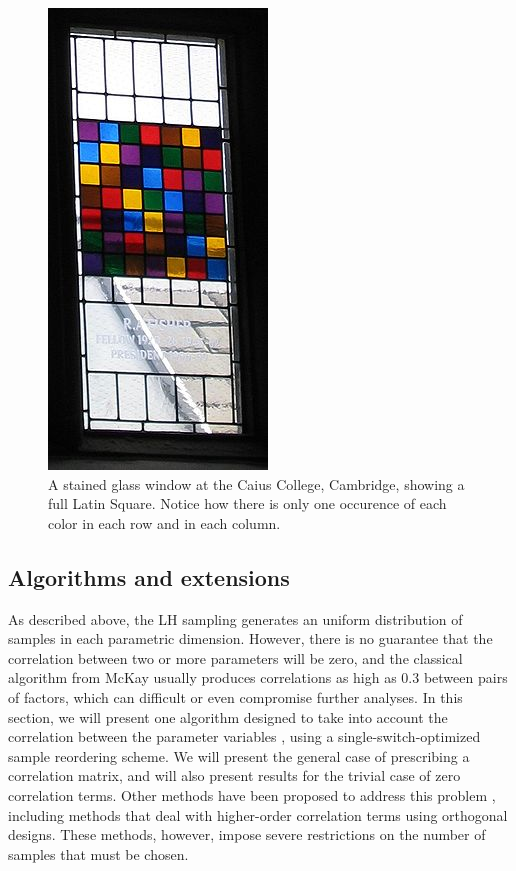 \begin{figure}[htpb]
	\begin{center}
		\includegraphics[width=200 pt]{fig/glassLS.png}
	\end{center}
	\caption{A stained glass window at the Caius College, Cambridge, 
	showing a full Latin Square. Notice how there is only one occurence 
	of each color in each row and in each column.}
	\label{fig:glassLS}
\end{figure}

\subsection{Algorithms and extensions}\label{ext}
As described above, the LH sampling generates an uniform distribution of samples 
in each parametric dimension. However, there is no guarantee that the correlation 
between two or more parameters will be zero, and the classical algorithm
from McKay \cite{McKay79} usually produces correlations as high as 0.3 between
pairs of factors, which can difficult or even compromise further analyses. In this
section, we will present one algorithm designed to take into
account the correlation between the parameter variables \cite{Huntington98}, using
a single-switch-optimized sample reordering scheme. 
We will present the general case of prescribing a correlation matrix, and will 
also present results for the trivial case of zero correlation terms. Other
methods have been proposed to address this problem \cite{Ye98, Steinberg06, Florian92}, 
including methods that deal with higher-order correlation terms \cite{Tang98}
using orthogonal designs. These methods, however, impose severe restrictions 
on the number of samples that must be chosen.

